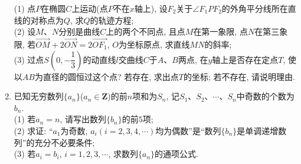 \documentclass[10pt,a4paper]{article}
\begin{document}
\begin{enumerate}[1.]
(1) 点$P$在椭圆$C$上运动(点$P$不在$x$轴上), 设$F_2$关于$\angle F_1PF_2$的外角平分线所在直线的对称点为$Q$, 求$Q$的轨迹方程;\\
(2) 设$M$、$N$分别是曲线$C$上的两个不同点, 且点$M$在第一象限, 点$N$在第三象限, 若$\overrightarrow{OM}+2\overrightarrow{ON}=2\overrightarrow{OF_1}$, $O$为坐标原点, 求直线$MN$的斜率;\\
(3) 过点$S(0,-\dfrac 13)$的动直线$l$交曲线$C$于$A$、$B$两点, 在$y$轴上是否存在定点$T$, 使以$AB$为直径的圆恒过这个点? 若存在, 求出点$T$的坐标; 若不存在, 请说明理由.
\item 已知无穷数列$\{a_n\}$($a_n\in \mathbf{Z}$)的前$n$项和为$S_n$, 记$S_1$、$S_2$、$\cdots$、$S_n$中奇数的个数为$b_n$.\\
(1) 若$a_n=n$, 请写出数列$\{b_n\}$的前$5$项;\\
(2) 求证: ``$a_1$为奇数, $a_i(i=2,3,4,\cdots)$均为偶数''是``数列$\{b_n\}$是单调递增数列''的充分不必要条件;\\
(3) 若$a_i=b_i$, $i=1,2,3,\cdots$, 求数列$\{a_n\}$的通项公式.


\end{enumerate}
\end{document}
